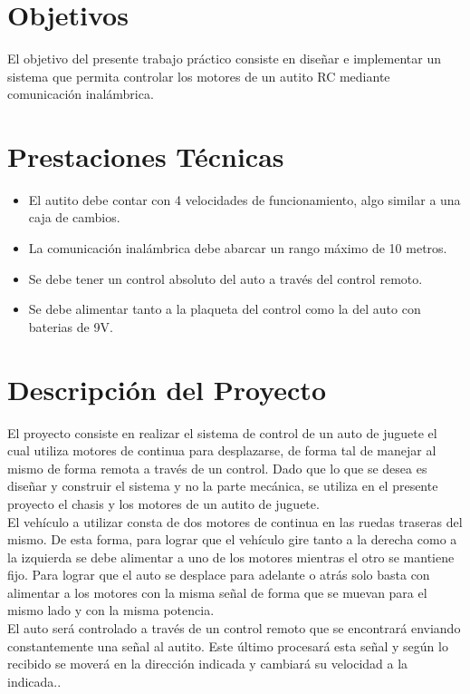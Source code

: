 \documentclass[a4paper,10pt]{article}
\title{  }
\begin{document}
	\maketitle %
	\newpage

	\tableofcontents %
	\newpage

	\section{Objetivos}
		El objetivo del presente trabajo práctico consiste en diseñar e implementar un sistema que permita controlar los motores de un autito RC mediante 
		comunicación inalámbrica. 

	\section{Prestaciones Técnicas}
		\begin{itemize}
			\item El autito debe contar con 4 velocidades de funcionamiento, algo similar a una caja de cambios.
			\item La comunicación inalámbrica debe abarcar un rango máximo de 10 metros. 
			\item Se debe tener un control absoluto del auto a través del control remoto.
			\item Se debe alimentar tanto a la plaqueta del control como la del auto con baterias de 9V.
		\end{itemize} 

	\section{Descripción del Proyecto}
		El proyecto consiste en realizar el sistema de control de un auto de juguete el cual utiliza motores de continua para desplazarse, de forma tal de 
		manejar al mismo de forma remota a través de un control. Dado que lo que se desea es diseñar y construir el sistema y no la parte mecánica, se
		 utiliza en el presente proyecto  el chasis y los motores de un autito de juguete. \\
		\indent El vehículo a utilizar consta de dos motores de continua en las ruedas traseras del mismo. De esta forma, para lograr que el vehículo gire 
		tanto a la derecha como a la izquierda se debe alimentar a uno de los motores mientras el otro se mantiene fijo. Para lograr que el auto se desplace 
		para adelante o atrás solo basta con alimentar a los motores con la misma señal de forma que se muevan para el mismo lado y con la misma 
		potencia. \\
		\indent El auto será controlado a través de un control remoto que se encontrará enviando constantemente una señal al autito. Este último procesará 
		esta señal
		y según lo recibido se moverá en la dirección indicada y cambiará su velocidad a la indicada..
	
\end{document}
